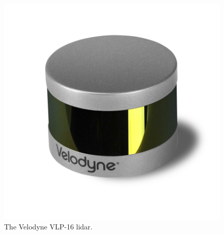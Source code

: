 \begin{figure}[H]
    \centering
    \includegraphics[width=\linewidth]{fig/Velodyne_LiDAR_Puck_VLP-16_Left_900.png}
    \caption{The Velodyne VLP-16 lidar.}
    \label{fig:vlp_16}
\end{figure}
